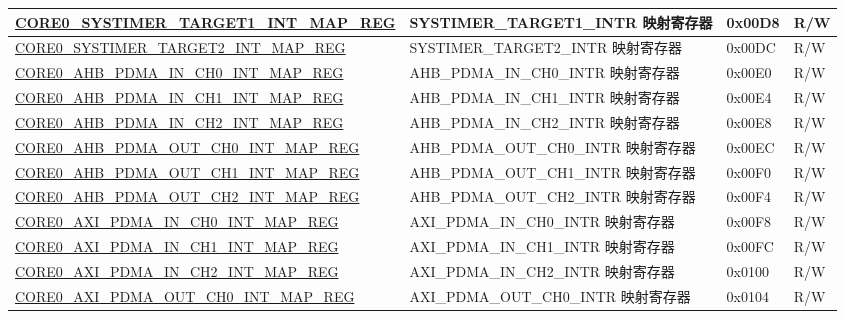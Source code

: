 \begin{longtable}{ | p{8.7cm} | p{6.2cm} | p{1.3cm} | p{1cm} | }
\hyperref[regdesc:CORE0SYSTIMERTARGET1INTMAPREG]{CORE0\_SYSTIMER\_TARGET1\_INT\_MAP\_REG} & SYSTIMER\_TARGET1\_INTR 映射寄存器 & 0x00D8 & R/W \\ \hline

\hyperref[regdesc:CORE0SYSTIMERTARGET2INTMAPREG]{CORE0\_SYSTIMER\_TARGET2\_INT\_MAP\_REG} & SYSTIMER\_TARGET2\_INTR 映射寄存器 & 0x00DC & R/W \\ \hline

\hyperref[regdesc:CORE0AHBPDMAINCH0INTMAPREG]{CORE0\_AHB\_PDMA\_IN\_CH0\_INT\_MAP\_REG} & AHB\_PDMA\_IN\_CH0\_INTR 映射寄存器 & 0x00E0 & R/W \\ \hline

\hyperref[regdesc:CORE0AHBPDMAINCH1INTMAPREG]{CORE0\_AHB\_PDMA\_IN\_CH1\_INT\_MAP\_REG} & AHB\_PDMA\_IN\_CH1\_INTR 映射寄存器 & 0x00E4 & R/W \\ \hline

\hyperref[regdesc:CORE0AHBPDMAINCH2INTMAPREG]{CORE0\_AHB\_PDMA\_IN\_CH2\_INT\_MAP\_REG} & AHB\_PDMA\_IN\_CH2\_INTR 映射寄存器 & 0x00E8 & R/W \\ \hline

\hyperref[regdesc:CORE0AHBPDMAOUTCH0INTMAPREG]{CORE0\_AHB\_PDMA\_OUT\_CH0\_INT\_MAP\_REG} & AHB\_PDMA\_OUT\_CH0\_INTR 映射寄存器 & 0x00EC & R/W \\ \hline

\hyperref[regdesc:CORE0AHBPDMAOUTCH1INTMAPREG]{CORE0\_AHB\_PDMA\_OUT\_CH1\_INT\_MAP\_REG} & AHB\_PDMA\_OUT\_CH1\_INTR 映射寄存器 & 0x00F0 & R/W \\ \hline

\hyperref[regdesc:CORE0AHBPDMAOUTCH2INTMAPREG]{CORE0\_AHB\_PDMA\_OUT\_CH2\_INT\_MAP\_REG} & AHB\_PDMA\_OUT\_CH2\_INTR 映射寄存器 & 0x00F4 & R/W \\ \hline

\hyperref[regdesc:CORE0AXIPDMAINCH0INTMAPREG]{CORE0\_AXI\_PDMA\_IN\_CH0\_INT\_MAP\_REG} & AXI\_PDMA\_IN\_CH0\_INTR 映射寄存器 & 0x00F8 & R/W \\ \hline

\hyperref[regdesc:CORE0AXIPDMAINCH1INTMAPREG]{CORE0\_AXI\_PDMA\_IN\_CH1\_INT\_MAP\_REG} & AXI\_PDMA\_IN\_CH1\_INTR 映射寄存器 & 0x00FC & R/W \\ \hline

\hyperref[regdesc:CORE0AXIPDMAINCH2INTMAPREG]{CORE0\_AXI\_PDMA\_IN\_CH2\_INT\_MAP\_REG} & AXI\_PDMA\_IN\_CH2\_INTR 映射寄存器 & 0x0100 & R/W \\ \hline

\hyperref[regdesc:CORE0AXIPDMAOUTCH0INTMAPREG]{CORE0\_AXI\_PDMA\_OUT\_CH0\_INT\_MAP\_REG} & AXI\_PDMA\_OUT\_CH0\_INTR 映射寄存器 & 0x0104 & R/W \\ \hline


\end{longtable}
